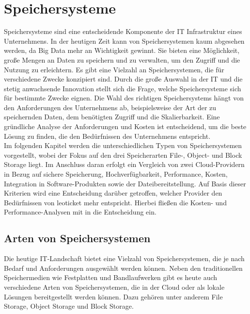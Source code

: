 \chapter{Speichersysteme}

Speichersysteme sind eine entscheidende Komponente der IT Infrastruktur eines Unternehmens. In der heutigen Zeit kann von Speichersystemen kaum abgesehen werden, da Big Data mehr an Wichtigkeit gewinnt. Sie bieten eine Möglichkeit, große Mengen an Daten zu speichern und zu verwalten, um den Zugriff und die Nutzung zu erleichtern. Es gibt eine Vielzahl an Speichersystemen, die für verschiedene Zwecke konzipiert sind. Durch die große Auswahl in der IT und die stetig anwachsende Innovation stellt sich die Frage, welche Speichersysteme sich für bestimmte Zwecke eignen. Die Wahl des richtigen Speichersystems hängt von den Anforderungen des Unternehmens ab, beispielsweise der Art der zu speichernden Daten, dem benötigten Zugriff und die Skalierbarkeit. Eine gründliche Analyse der Anforderungen und Kosten ist entscheidend, um die beste Lösung zu finden, die den Bedürfnissen des Unternehmens entspricht.\\

Im folgenden Kapitel werden die unterschiedlichen Typen von Speichersystemen vorgestellt, wobei der Fokus auf den drei Speicherarten File-, Object- und Block Storage liegt. Im Anschluss daran erfolgt ein Vergleich von zwei Cloud-Providern in Bezug auf sichere Speicherung, Hochverfügbarkeit, Performance, Kosten, Integration in Software-Produkten sowie der Dateibereitstellung. Auf Basis dieser Kriterien wird eine Entscheidung darüber getroffen, welcher Provider den Bedürfnissen von leoticket mehr entspricht. Hierbei fließen die Kosten- und Performance-Analysen mit in die Entscheidung ein.

\newpage

\section{Arten von Speichersystemen}
 
Die heutige IT-Landschaft bietet eine Vielzahl von Speichersystemen, die je nach Bedarf und Anforderungen ausgewählt werden können. Neben den traditionellen Speichermedien wie Festplatten und Bandlaufwerken gibt es heute auch verschiedene Arten von Speichersystemen, die in der Cloud oder als lokale Lösungen bereitgestellt werden können. Dazu gehören unter anderem File Storage, Object Storage und Block Storage.\\

